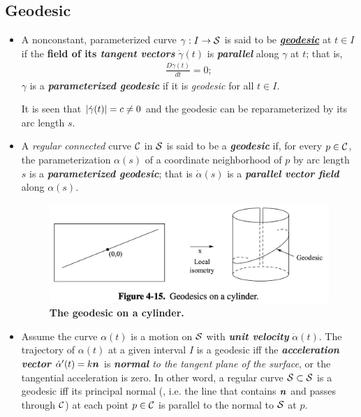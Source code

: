 \documentclass[11pt]{article}
\begin{document}
\subsection{Geodesic}
\begin{itemize}
\item \begin{definition}
A nonconstant, parameterized curve $\gamma: I \rightarrow {\mathcal S}$ is said to be \underline{\emph{\textbf{geodesic}}} at $t\in I$ if the \textbf{field of its \emph{tangent vectors}} $\dot{\gamma}(t)$ is \textbf{\emph{parallel}} along $\gamma$ at $t$; that is, 
\begin{align*}
\frac{D\dot{\gamma}(t)}{dt} = 0;
\end{align*}
$\gamma$ is a \emph{\textbf{parameterized geodesic}} if it is \emph{geodesic} for all $t\in I$.
\end{definition} It is seen that $\left\lvert \dot{\gamma}(t) \right\rvert = c\neq 0$ and the geodesic can be reparameterized by its arc length $s$.


\item \begin{definition}
A \emph{regular} \emph{connected} curve ${\mathcal C}$ in ${\mathcal S}$ is said to be a \emph{\textbf{geodesic}} if, for every $p\in {\mathcal C}$, the parameterization $\alpha(s)$ of a coordinate neighborhood of $p$ by arc length $s$ is a \emph{\textbf{parameterized geodesic}}; that is $\dot{\alpha}(s)$ is a \emph{\textbf{parallel vector field}} along $\alpha(s)$.
\end{definition}

\begin{figure}[htb]
\centering
\begin{minipage}{0.6\linewidth}
 \centerline{\includegraphics[scale = 0.6]{geodesic_cyliner.png}}
\end{minipage}
\caption{\scriptsize
\textbf{The geodesic on a cylinder.}}
\label{fig: geodesic_cyliner}
\end{figure}


\item Assume the curve $\alpha(t)$ is a motion on ${\mathcal S}$ with \emph{\textbf{unit velocity}} $\dot{\alpha}(t)$. The trajectory of $\alpha(t)$ at a given interval $I$ is a geodesic iff the \emph{\textbf{acceleration vector}} $\dot{\alpha}'(t) = k\boldsymbol{n}$ is \emph{\textbf{normal} to the tangent plane of the surface}, or the tangential acceleration is zero. In other word, a regular curve ${\mathcal S} \subset {\mathcal S}$ is a geodesic iff its principal normal (, i.e. the line that contains $\boldsymbol{n}$ and passes through ${\mathcal C}$) at each point $p\in {\mathcal C}$ is parallel to the normal to ${\mathcal S}$ at $p$.
  

\end{itemize}
\end{document}
